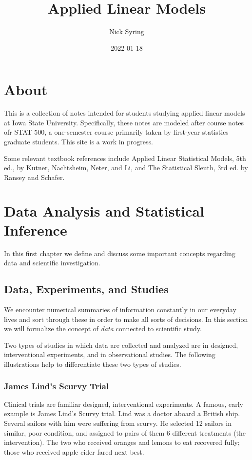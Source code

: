\documentclass[]{book}
\title{Applied Linear Models}
\author{Nick Syring}
\date{2022-01-18}
\begin{document}
\maketitle

{
\setcounter{tocdepth}{1}
\tableofcontents
}
\chapter{About}\label{about}

This is a collection of notes intended for students studying applied
linear models at Iowa State University. Specifically, these notes are
modeled after course notes ofr STAT 500, a one-semester course primarily
taken by first-year statistics graduate students. This site is a work in
progress.

Some relevant textbook references include Applied Linear Statistical
Models, 5th ed., by Kutner, Nachtsheim, Neter, and Li, and The
Statistical Sleuth, 3rd ed. by Ransey and Schafer.

\chapter{Data Analysis and Statistical
Inference}\label{data-analysis-and-statistical-inference}

In this first chapter we define and discuss some important concepts
regarding data and scientific investigation.

\section{Data, Experiments, and
Studies}\label{data-experiments-and-studies}

We encounter numerical summaries of information constantly in our
everyday lives and sort through these in order to make all sorts of
decisions. In this section we will formalize the concept of \emph{data}
connected to scientific study.

Two types of studies in which data are collected and analyzed are in
designed, interventional experiments, and in observational studies. The
following illustrations help to differentiate these two types of
studies.

\subsection{James Lind's Scurvy Trial}\label{james-linds-scurvy-trial}

Clinical trials are familiar designed, interventional experiments. A
famous, early example is James Lind's Scurvy trial. Lind was a doctor
aboard a British ship. Several sailors with him were suffering from
scurvy. He selected 12 sailors in similar, poor condition, and assigned
to pairs of them 6 different treatments (the intervention). The two who
received oranges and lemons to eat recovered fully; those who received
apple cider fared next best.
\end{document}
